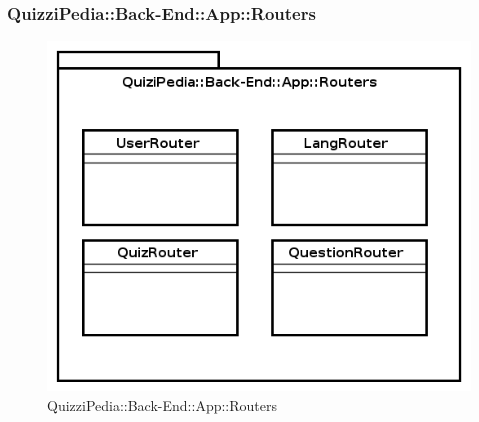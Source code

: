 \subsubsection{QuizziPedia::Back-End::App::Routers}

\label{QuizziPedia::Back-End::App::Routers}
\begin{figure}[ht]
	\centering
	\includegraphics[scale=0.65]{UML/Package/QuizziPedia_Back-End_App_Routers.png}
	\caption{QuizziPedia::Back-End::App::Routers}
\end{figure}
\FloatBarrier
